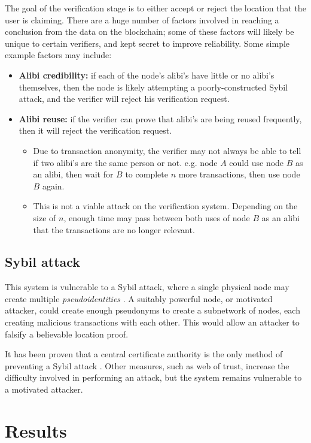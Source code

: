 \documentclass[12pt]{article}
\begin{document}
The goal of the verification stage is to either accept or reject the location that the user is claiming. There are a huge number of factors involved in reaching a conclusion from the data on the blockchain; some of these factors will likely be unique to certain verifiers, and kept secret to improve reliability. Some simple example factors may include:
\begin{itemize}
	\item \textbf{Alibi credibility:} if each of the node’s alibi’s have little or no alibi’s themselves, then the node is likely attempting a poorly-constructed Sybil attack, and the verifier will reject his verification request.
	\item \textbf{Alibi reuse:} if the verifier can prove that alibi’s are being reused frequently, then it will reject the verification request.
	\begin{itemize}
		\item Due to transaction anonymity, the verifier may not always be able to tell if two alibi's are the same person or not. e.g. node $A$ could use node $B$ as an alibi, then wait for $B$ to complete $n$ more transactions, then use node $B$ again.
		\item This is not a viable attack on the verification system. Depending on the size of $n$, enough time may pass between both uses of node $B$ as an alibi that the transactions are no longer relevant.
	\end{itemize}
\end{itemize}

\subsection{Sybil attack}
This system is vulnerable to a Sybil attack, where a single physical node may create multiple \textit{pseudoidentities} \cite{sybil}. A suitably powerful node, or motivated attacker, could create enough pseudonyms to create a subnetwork of nodes, each creating malicious transactions with each other. This would allow an attacker to falsify a believable location proof.

It has been proven that a central certificate authority is the only method of preventing a Sybil attack \cite{sybil}. Other measures, such as web of trust, increase the difficulty involved in performing an attack, but the system remains vulnerable to a motivated attacker.

\section{Results}
\end{document}
